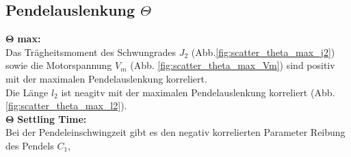\subsection*{Pendelauslenkung $\Theta$}
$\bm{\Theta}$ \textbf{max: }\\
Das Trägheitsmoment des Schwungrades $J_2$ (Abb.\ref{fig:scatter_theta_max_j2}) sowie die Motorspannung $V_m$ (Abb. \ref{fig:scatter_theta_max_Vm}) sind positiv mit der maximalen Pendelauslenkung korreliert.\\
Die Länge $l_2$ ist neagitv mit der maximalen Pendelauslenkung korreliert (Abb. \ref{fig:scatter_theta_max_l2}).\\
$\bm{\Theta}$ \textbf{Settling Time: }\\
Bei der Pendeleinschwingzeit gibt es den negativ korrelierten Parameter \glqq Reibung des Pendels $C_1$\grqq{},
